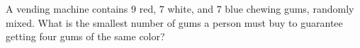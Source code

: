 A vending machine contains $9$ red, $7$ white, and $7$ blue chewing gums, randomly mixed. What is the smallest number of gums a person must buy to guarantee getting four gums of the same color?
